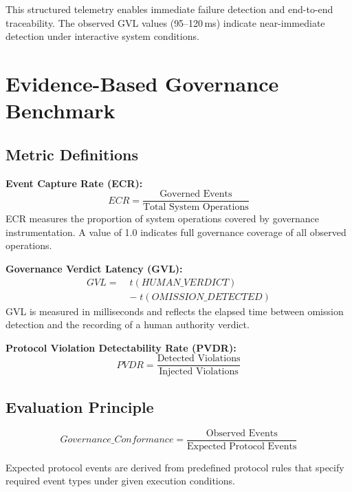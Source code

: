 \documentclass[conference]{IEEEtran}
\begin{document}
This structured telemetry enables immediate failure detection and end-to-end
traceability. The observed GVL values (95--120\,ms) indicate near-immediate
detection under interactive system conditions.

\section{Evidence-Based Governance Benchmark}

\subsection{Metric Definitions}

\noindent\textbf{Event Capture Rate (ECR):}
\begin{equation}
  ECR = \frac{\text{Governed Events}}{\text{Total System Operations}}
\end{equation}
ECR measures the proportion of system operations covered by governance
instrumentation. A value of 1.0 indicates full governance coverage of all
observed operations.

\medskip
\noindent\textbf{Governance Verdict Latency (GVL):}
\begin{equation}
\begin{split}
  GVL = \; & t(\mathit{HUMAN\_VERDICT}) \\
            & - \; t(\mathit{OMISSION\_DETECTED})
\end{split}
\end{equation}
GVL is measured in milliseconds and reflects the elapsed time between
omission detection and the recording of a human authority verdict.

\medskip
\noindent\textbf{Protocol Violation Detectability Rate (PVDR):}
\begin{equation}
  PVDR = \frac{\text{Detected Violations}}{\text{Injected Violations}}
\end{equation}

\subsection{Evaluation Principle}

\begin{equation}
  \mathit{Governance\_Conformance} =
    \frac{\text{Observed Events}}{\text{Expected Protocol Events}}
\end{equation}

Expected protocol events are derived from predefined protocol rules that specify
required event types under given execution conditions.
\end{document}
